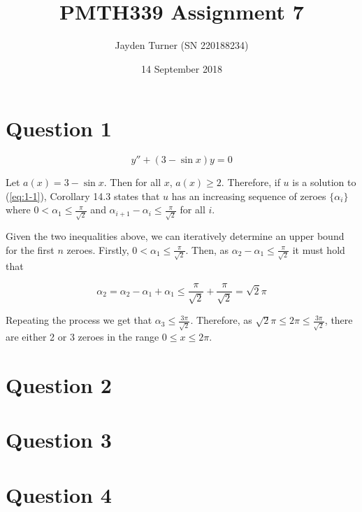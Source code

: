 \documentclass{article}
\title{PMTH339 Assignment 7}
\date{14 September 2018}
\author{Jayden Turner (SN 220188234)}
\begin{document}
\maketitle
{}

\section*{Question 1}

\begin{equation} \label{eq:1-1}
    y'' + (3 - \sin x)y = 0
\end{equation}

Let $a(x) = 3 - \sin x$. Then for all $x$, $a(x) \geq 2$. Therefore,
if $u$ is a solution to (\ref{eq:1-1}), Corollary 14.3 states that $u$ has an
increasing sequence of zeroes $\{\alpha_i\}$ where $0 < \alpha_1 \leq \frac{\pi}{\sqrt{2}}$
and $\alpha_{i + 1} - \alpha_i \leq \frac{\pi}{\sqrt{2}}$ for all $i$.

\hfill \break
Given the two inequalities above, we can iteratively determine an upper bound for the
first $n$ zeroes. Firstly, $0 < \alpha_1 \leq \frac{\pi}{\sqrt{2}}$. Then, as
$\alpha_2 - \alpha_1 \leq \frac{\pi}{\sqrt{2}}$ it must hold that

\begin{equation*}
    \alpha_2 = \alpha_2 - \alpha_1 + \alpha_1 \leq 
        \frac{\pi}{\sqrt{2}} + \frac{\pi}{\sqrt{2}} = \sqrt{2}\pi
\end{equation*}

Repeating the process we get that $\alpha_3 \leq \frac{3\pi}{\sqrt{2}}$. Therefore, as
$\sqrt{2}\pi \leq 2\pi \leq \frac{3\pi}{\sqrt{2}}$, there are either 2 or 3 zeroes in the
range $0 \leq x \leq 2\pi$.

\section*{Question 2}

\section*{Question 3}

\section*{Question 4}
\end{document}
